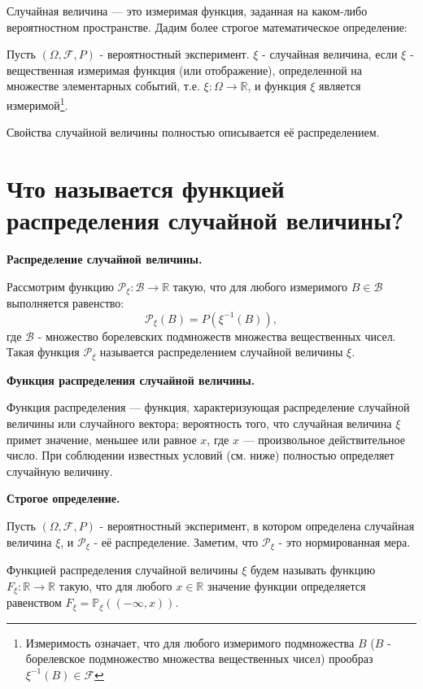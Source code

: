 Случайная величина — это измеримая функция, заданная на каком-либо вероятностном пространстве. Дадим более строгое математическое определение:

Пусть $(\Omega, \mathcal{F}, P)$ - вероятностный эксперимент. $\xi$ - случайная величина, если $\xi$ - вещественная измеримая функция (или отображение), определенной на множестве элементарных событий, т.е. $\xi: \Omega \to \mathbb{R}$, и функция $\xi$ является измеримой\footnote{Измеримость означает, что для любого измеримого подмножества $B$ ($B$ - борелевское подмножество множества вещественных чисел) прообраз $\xi^{-1} (B) \in \mathcal{F}$}.

\begin{remark}
	Свойства случайной величины полностью описывается её распределением.
\end{remark}

\section{Что называется функцией распределения случайной величины?}

\textbf{Распределение случайной величины.}

Рассмотрим функцию $\mathcal{P}_{\xi}: \mathcal{B} \to \mathbb{R}$ такую, что для любого измеримого $B \in \mathcal{B}$ выполняется равенство:
\[ \mathcal{P}_{\xi} (B) = P (\xi^{-1} (B)), \]
где $\mathcal{B}$ - множество борелевских подмножеств множества вещественных чисел. Такая функция $\mathcal{P}_{\xi}$ называется распределением случайной величины $\xi$.

\textbf{Функция распределения случайной величины.}

Функция распределения — функция, характеризующая распределение случайной величины или случайного вектора; вероятность того, что случайная величина $\xi$ примет значение, меньшее или равное $x$, где $x$ — произвольное действительное число. При соблюдении известных условий (см. ниже) полностью определяет случайную величину.

\textbf{Строгое определение.}

\noindent Пусть $(\Omega, \mathcal{F}, P)$ - вероятностный эксперимент, в котором определена случайная величина $\xi$, и $\mathcal{P}_{\xi}$ - её распределение. Заметим, что $\mathcal{P}_{\xi}$ - это нормированная мера.

Функцией распределения случайной величины $\xi$ будем называть функцию $F_{\xi}: \mathbb{R} \to \mathbb{R}$ такую, что для любого $x \in \mathbb{R}$ значение функции определяется равенством $F_{\xi} = \mathbb{P}_{\xi} ( (-\infty, x) )$.

